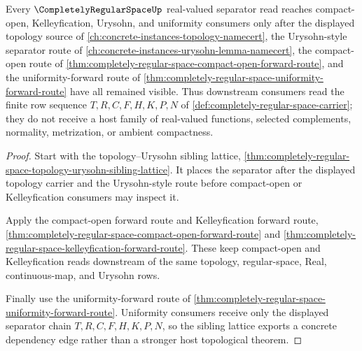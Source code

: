 \begin{theorem}
\label{thm:completely-regular-space-topology-uniformity-consumer-lattice}
Every $\CompletelyRegularSpaceUp$ real-valued separator read reaches compact-open, Kelleyfication, Urysohn, and uniformity consumers only after the displayed topology source of \autoref{ch:concrete-instances-topology-namecert}, the Urysohn-style separator route of \autoref{ch:concrete-instances-urysohn-lemma-namecert}, the compact-open route of \autoref{thm:completely-regular-space-compact-open-forward-route}, and the uniformity-forward route of \autoref{thm:completely-regular-space-uniformity-forward-route} have all remained visible. Thus downstream consumers read the finite row sequence $T,R,C,F,H,K,P,N$ of \autoref{def:completely-regular-space-carrier}; they do not receive a host family of real-valued functions, selected complements, normality, metrization, or ambient compactness.
\end{theorem}
\begin{proof}
Start with the topology--Urysohn sibling lattice, \autoref{thm:completely-regular-space-topology-urysohn-sibling-lattice}. It places the separator after the displayed topology carrier and the Urysohn-style route before compact-open or Kelleyfication consumers may inspect it.

Apply the compact-open forward route and Kelleyfication forward route, \autoref{thm:completely-regular-space-compact-open-forward-route} and \autoref{thm:completely-regular-space-kelleyfication-forward-route}. These keep compact-open and Kelleyfication reads downstream of the same topology, regular-space, Real, continuous-map, and Urysohn rows.

Finally use the uniformity-forward route of \autoref{thm:completely-regular-space-uniformity-forward-route}. Uniformity consumers receive only the displayed separator chain $T,R,C,F,H,K,P,N$, so the sibling lattice exports a concrete dependency edge rather than a stronger host topological theorem.
\end{proof}

